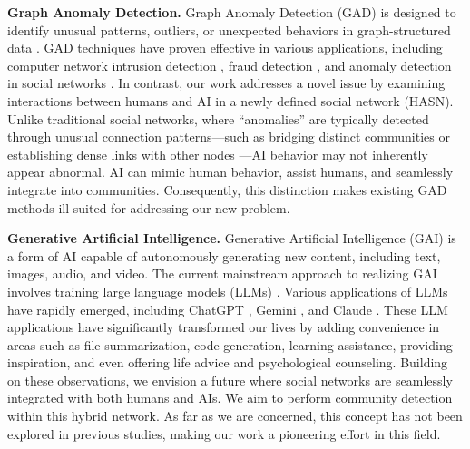 \noindent\textbf{Graph Anomaly Detection.} Graph Anomaly Detection (GAD) is designed to identify unusual patterns, outliers, or unexpected behaviors in graph-structured data \cite{ma2021comprehensive}\cite{lamichhane2024anomaly}. GAD techniques have proven effective in various applications, including computer network intrusion detection \cite{bilot2023graph}, fraud detection \cite{xiang2023semi}, and anomaly detection in social networks \cite{yu2016survey}\cite{roy2024gad}. In contrast, our work addresses a novel issue by examining interactions between humans and AI in a newly defined social network (HASN). Unlike traditional social networks, where “anomalies” are typically detected through unusual connection patterns—such as bridging distinct communities or establishing dense links with other nodes \cite{ma2021comprehensive}—AI behavior may not inherently appear abnormal. AI can mimic human behavior, assist humans, and seamlessly integrate into communities. Consequently, this distinction makes existing GAD methods ill-suited for addressing our new problem.

\noindent\textbf{Generative Artificial Intelligence.} Generative Artificial Intelligence (GAI) is a form of AI capable of autonomously generating new content, including text, images, audio, and video. The current mainstream approach to realizing GAI involves training large language models (LLMs) \cite{guo2024large}. Various applications of LLMs have rapidly emerged, including ChatGPT \cite{achiam2023gpt}, Gemini \cite{team2023gemini}, and Claude \cite{AnthropicAI2023}. These LLM applications have significantly transformed our lives by adding convenience in areas such as file summarization, code generation, learning assistance, providing inspiration, and even offering life advice and psychological counseling. Building on these observations, we envision a future where social networks are seamlessly integrated with both humans and AIs. We aim to perform community detection within this hybrid network. As far as we are concerned, this concept has not been explored in previous studies, making our work a pioneering effort in this field.